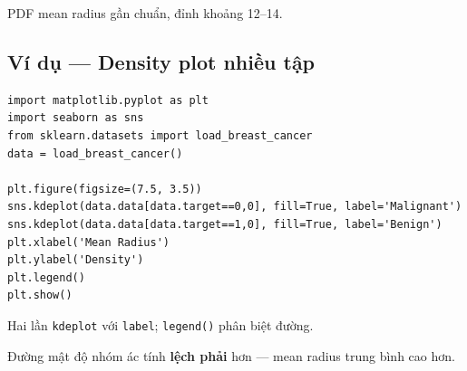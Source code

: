\begin{ynghia}[title={Đọc biểu đồ}]
PDF mean radius gần chuẩn, đỉnh khoảng 12--14.
\end{ynghia}

\begin{vidu}[title={Output (kdeplot)}]
\end{vidu}

\subsection{Ví dụ --- Density plot nhiều tập}

\begin{vidu}[title={So sánh ác tính / lành tính}]
\begin{lstlisting}
import matplotlib.pyplot as plt
import seaborn as sns
from sklearn.datasets import load_breast_cancer
data = load_breast_cancer()

plt.figure(figsize=(7.5, 3.5))
sns.kdeplot(data.data[data.target==0,0], fill=True, label='Malignant')
sns.kdeplot(data.data[data.target==1,0], fill=True, label='Benign')
plt.xlabel('Mean Radius')
plt.ylabel('Density')
plt.legend()
plt.show()
\end{lstlisting}

Hai lần \texttt{kdeplot} với \texttt{label}; \texttt{legend()} phân biệt đường.
\end{vidu}

\begin{ynghia}[title={Nhận xét}]
Đường mật độ nhóm ác tính \textbf{lệch phải} hơn --- mean radius trung bình cao hơn.
\end{ynghia}

\begin{vidu}[title={Output}]
\end{vidu}
